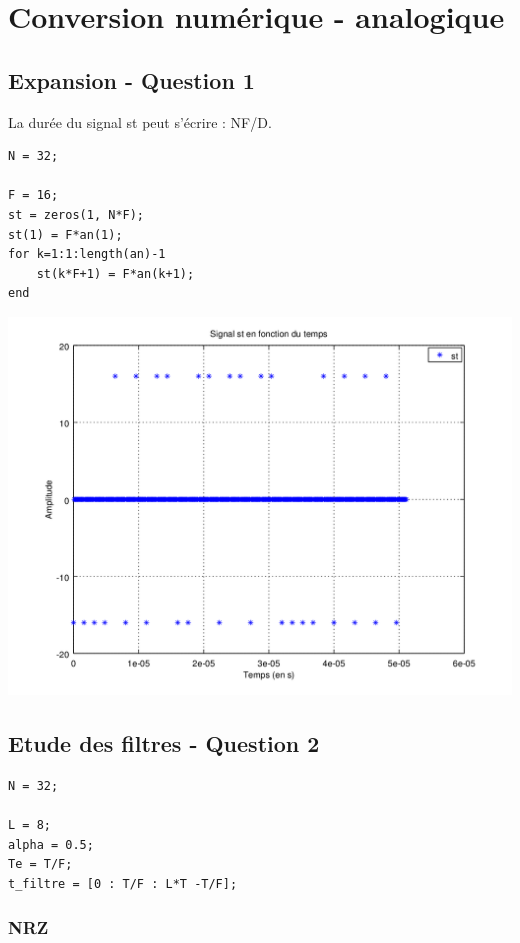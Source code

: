 \documentclass{acm_proc_article-sp}
\begin{document}
\section{Conversion numérique - analogique}
\subsection{Expansion - Question 1}

La durée du signal st peut s'écrire : NF/D.

\begin{center}
\begin{lstlisting}
N = 32;

F = 16;
st = zeros(1, N*F);
st(1) = F*an(1);
for k=1:1:length(an)-1
    st(k*F+1) = F*an(k+1);
end
\end{lstlisting}

\includegraphics[scale=0.45]{st_3.png}
\end{center}

\subsection{Etude des filtres - Question 2}

\begin{lstlisting}
N = 32;

L = 8;
alpha = 0.5;
Te = T/F;
t_filtre = [0 : T/F : L*T -T/F];
\end{lstlisting}

\subsubsection{NRZ}
\end{document}
